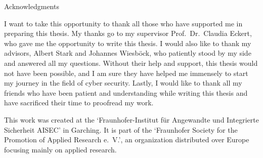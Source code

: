 \thispagestyle{empty}

\vspace*{20mm}

\begin{center}
    { Acknowledgments}
\end{center}

\vspace{10mm}

I want to take this opportunity to thank all those who have supported me in preparing this thesis.
My thanks go to my supervisor Prof.\ Dr.\ Claudia Eckert, who gave me the opportunity to write this thesis.
I would also like to thank my advisors, Albert Stark and Johannes Wiesböck, who patiently stood by my side and answered all my questions.
Without their help and support, this thesis would not have been possible, and I am sure they have helped me immensely to start my journey in the field of cyber security.
Lastly, I would like to thank all my friends who have been patient and understanding while writing this thesis and have sacrificed their time to proofread my work.

This work was created at the `Fraunhofer-Institut für Angewandte und Integrierte Sicherheit AISEC' in Garching.
It is part of the `Fraunhofer Society for the Promotion of Applied Research e.~V.', an organization distributed over Europe focusing mainly on applied research.

\cleardoublepage{}
